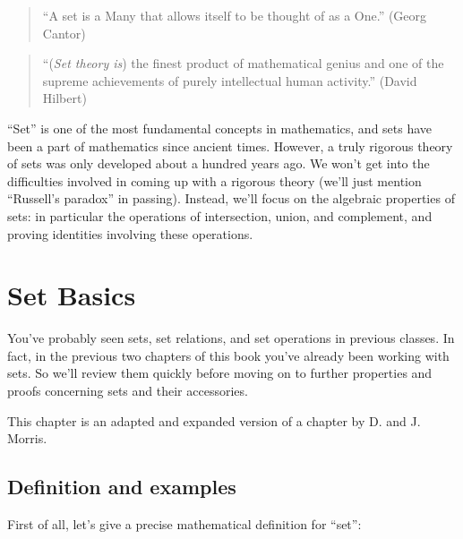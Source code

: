 


\begin{quote}
``A set is a Many that allows itself to be thought of as a One.'' (Georg Cantor)
\end{quote}
\begin{quote}
``(\emph{Set theory is}) the finest product of mathematical genius and one of the supreme achievements of purely intellectual human activity.'' (David Hilbert)
\end{quote}
\bigskip
``Set'' is one of the most fundamental concepts in mathematics, and sets have been a part of mathematics since ancient times. However, a truly rigorous theory of sets was only developed about a hundred years ago. We won't get into the difficulties involved in coming up with a rigorous theory (we'll just mention ``Russell's paradox'' in passing). Instead, we'll focus on the algebraic properties of sets: in particular the operations of intersection, union, and complement, and proving identities involving these operations.

\section{Set Basics \quad
{}}\label{basics}

You've probably seen sets, set relations, and set operations in previous classes.  In fact, in the previous two chapters of this book you've already been working with sets.  So we'll review them quickly before moving on to further properties and proofs concerning sets and their accessories.
\medskip

This chapter is an adapted and expanded version of a chapter by D. and J. Morris.
 
\subsection{Definition and examples}

First of all, let's give a precise mathematical definition for ``set'':

